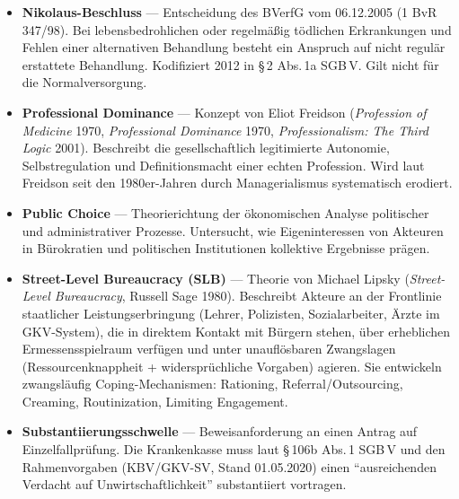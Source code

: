\documentclass{umbruch-position}
\begin{document}
\begin{sloppypar}
\begin{itemize}[leftmargin=1em, itemsep=0.6em]
  \item \textbf{Nikolaus-Beschluss} --- Entscheidung des BVerfG vom 06.12.2005 (1 BvR 347/98). Bei lebensbedrohlichen oder regelmäßig tödlichen Erkrankungen und Fehlen einer alternativen Behandlung besteht ein Anspruch auf nicht regulär erstattete Behandlung. Kodifiziert 2012 in \S\,2 Abs.\,1a SGB\,V. Gilt nicht für die Normalversorgung.
  \item \textbf{Professional Dominance} --- Konzept von Eliot Freidson (\textit{Profession of Medicine} 1970, \textit{Professional Dominance} 1970, \textit{Professionalism: The Third Logic} 2001). Beschreibt die gesellschaftlich legitimierte Autonomie, Selbstregulation und Definitionsmacht einer echten Profession. Wird laut Freidson seit den 1980er-Jahren durch Managerialismus systematisch erodiert.
  \item \textbf{Public Choice} --- Theorierichtung der ökonomischen Analyse politischer und administrativer Prozesse. Untersucht, wie Eigeninteressen von Akteuren in Bürokratien und politischen Institutionen kollektive Ergebnisse prägen.
  \item \textbf{Street-Level Bureaucracy (SLB)} --- Theorie von Michael Lipsky (\textit{Street-Level Bureaucracy}, Russell Sage 1980). Beschreibt Akteure an der Frontlinie staatlicher Leistungserbringung (Lehrer, Polizisten, Sozialarbeiter, Ärzte im GKV-System), die in direktem Kontakt mit Bürgern stehen, über erheblichen Ermessensspielraum verfügen und unter unauflösbaren Zwangslagen (Ressourcenknappheit + widersprüchliche Vorgaben) agieren. Sie entwickeln zwangsläufig Coping-Mechanismen: Rationing, Referral/Outsourcing, Creaming, Routinization, Limiting Engagement.
  \item \textbf{Substantiierungsschwelle} --- Beweisanforderung an einen Antrag auf Einzelfallprüfung. Die Krankenkasse muss laut \S\,106b Abs.\,1 SGB\,V und den Rahmenvorgaben (KBV/GKV-SV, Stand 01.05.2020) einen ``ausreichenden Verdacht auf Unwirtschaftlichkeit'' substantiiert vortragen.

\end{itemize}
\end{sloppypar}
\end{document}
